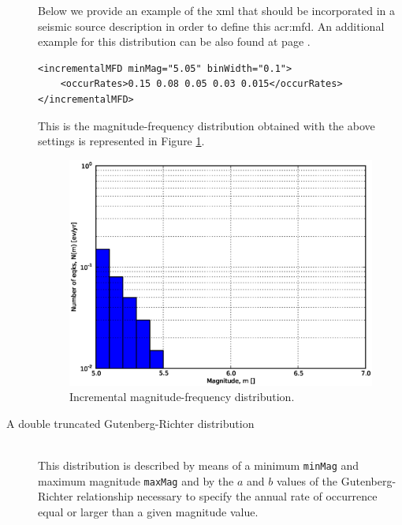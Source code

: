 \begin{description}
    Below we provide an example of the xml that should
    be incorporated in a seismic source description in order to define 
    this \gls{acr:mfd}. An additional example for this distribution can
    be also found at page \pageref{example_incremental_mfd}.
\begin{Verbatim}[frame=single, commandchars=\\\{\}, fontsize=\footnotesize]
<incrementalMFD minMag="5.05" binWidth="0.1">
    <occurRates>0.15 0.08 0.05 0.03 0.015</occurRates>
</incrementalMFD>
\end{Verbatim}
    This is the magnitude-frequency distribution obtained with the above
    settings is represented in Figure \ref{fig:evenly_discretized_mfd}.
\begin{figure}[!ht]
\centering
\includegraphics[width=12cm]{./figures/hazard/ed_mfd.eps}
\caption{Incremental magnitude-frequency distribution.}
\label{fig:evenly_discretized_mfd}
\end{figure}
%
\item[A double truncated Gutenberg-Richter distribution] \hfill \\
    This distribution is de\-scribed by means of a minimum \texttt{minMag}
    and maximum magnitude \texttt{maxMag} and by the $a$ and $b$ values 
    of the Gutenberg-Richter relationship necessary to specify the annual 
    rate of occurrence equal or larger than a given magnitude value. 
    

\end{description}
